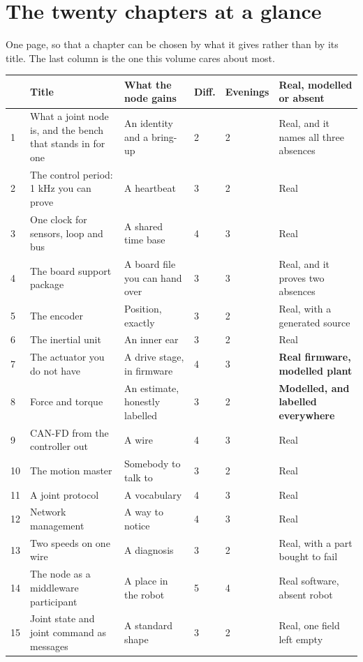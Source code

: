 \section{The twenty chapters at a glance}

One page, so that a chapter can be chosen by what it gives rather than by its
title. The last column is the one this volume cares about most.

\begin{table}[H]\centering\small
\begin{tabular}{p{5mm}p{54mm}p{30mm}p{8mm}p{10mm}p{34mm}}
\toprule
& Title & What the node gains & Diff. & Eve\-nings & Real, modelled or absent \\
\midrule
1 & What a joint node is, and the bench that stands in for one & An identity and a bring-up & 2 & 2 & Real, and it names all three absences \\
2 & The control period: 1 kHz you can prove & A heartbeat & 3 & 2 & Real \\
3 & One clock for sensors, loop and bus & A shared time base & 4 & 3 & Real \\
4 & The board support package & A board file you can hand over & 3 & 3 & Real, and it proves two absences \\
5 & The encoder & Position, exactly & 3 & 2 & Real, with a generated source \\
6 & The inertial unit & An inner ear & 3 & 2 & Real \\
7 & The actuator you do not have & A drive stage, in firmware & 4 & 3 & \textbf{Real firmware, modelled plant} \\
8 & Force and torque & An estimate, honestly labelled & 3 & 2 & \textbf{Modelled, and labelled everywhere} \\
9 & CAN-FD from the controller out & A wire & 4 & 3 & Real \\
10 & The motion master & Somebody to talk to & 3 & 2 & Real \\
11 & A joint protocol & A vocabulary & 4 & 3 & Real \\
12 & Network management & A way to notice & 4 & 3 & Real \\
13 & Two speeds on one wire & A diagnosis & 3 & 2 & Real, with a part bought to fail \\
14 & The node as a middleware participant & A place in the robot & 5 & 4 & Real software, absent robot \\
15 & Joint state and joint command as messages & A standard shape & 3 & 2 & Real, one field left empty \\

\end{tabular}
\end{table}
